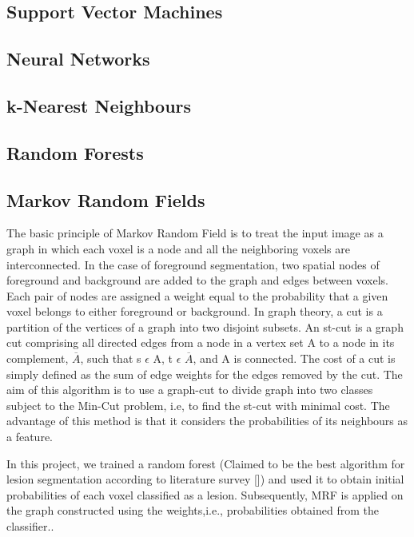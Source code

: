 \documentclass{article} %
\begin{document}
\subsection{Support Vector Machines}

\subsection{Neural Networks}

\subsection{k-Nearest Neighbours}

\subsection{Random Forests}

\subsection{Markov Random Fields}
The basic principle of Markov Random Field is to treat the input image as a graph in which each voxel is a node and all the neighboring voxels are interconnected. In the case of foreground segmentation, two spatial nodes of foreground and background are added to the graph and edges between voxels. Each pair of nodes are assigned a weight equal to the probability that a given voxel belongs to either foreground or background. In graph theory, a cut is a partition of the vertices of a graph into two disjoint subsets. An st-cut is a graph cut comprising all directed edges from a node in a vertex set A to a node in its complement, $\overline{A}$, such that s $\epsilon$ A, t $\epsilon$ $\overline{A}$, and A is connected. The cost of a cut is simply defined as the sum of edge weights for the edges removed by the cut. The aim of this algorithm is to use a graph-cut to divide graph into two classes subject to the Min-Cut problem, i.e, to find the st-cut with minimal cost. The advantage of this method is that it considers the probabilities of its neighbours as a feature.

In this project, we trained a random forest (Claimed to be the best algorithm for lesion segmentation according to literature survey []) and used it to obtain initial probabilities of each voxel classified as a lesion. Subsequently, MRF is applied on the graph constructed using the weights,i.e., probabilities obtained from the classifier..
\end{document}
